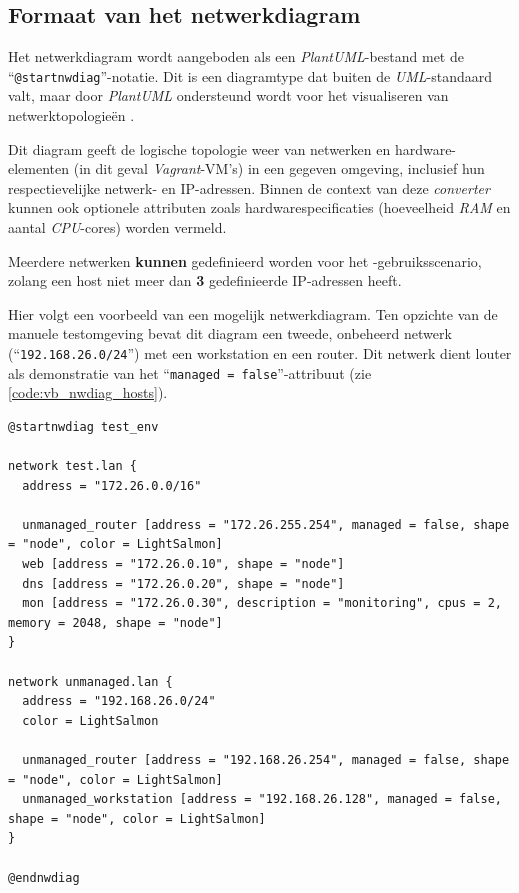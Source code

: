 \subsection{Formaat van het netwerkdiagram}%
\label{subsec:formaat_nwdiag}

Het netwerkdiagram wordt aangeboden als een \emph{PlantUML}-bestand met de ``\texttt{@startnwdiag}''-notatie. Dit is een diagramtype dat buiten de \emph{UML}-standaard valt, maar door \emph{PlantUML} ondersteund wordt voor het visualiseren van netwerktopologieën \autocite{PlantUML2025}.

Dit diagram geeft de logische topologie weer van netwerken en hardware-elementen (in dit geval \emph{Vagrant}-VM's) in een gegeven omgeving, inclusief hun respectievelijke netwerk- en IP-adressen. Binnen de context van deze \emph{converter} kunnen ook optionele attributen zoals hardwarespecificaties (hoeveelheid \emph{RAM} en aantal \emph{CPU}-cores) worden vermeld.

Meerdere netwerken \textbf{kunnen} gedefinieerd worden voor het -gebruiksscenario, zolang een host niet meer dan \textbf{3} gedefinieerde IP-adressen heeft.

Hier volgt een voorbeeld van een mogelijk netwerkdiagram. Ten opzichte van de manuele testomgeving bevat dit diagram een tweede, onbeheerd netwerk (``\texttt{192.168.26.0/24}'') met een workstation en een router. Dit netwerk dient louter als demonstratie van het ``\texttt{managed = false}''-attribuut (zie \autoref{code:vb_nwdiag_hosts}).

\begin{codeblockfixed}
\begin{codeblock}
  \begin{lstlisting}[language=plantuml]
@startnwdiag test_env

network test.lan {
  address = "172.26.0.0/16"

  unmanaged_router [address = "172.26.255.254", managed = false, shape = "node", color = LightSalmon]
  web [address = "172.26.0.10", shape = "node"]
  dns [address = "172.26.0.20", shape = "node"]
  mon [address = "172.26.0.30", description = "monitoring", cpus = 2, memory = 2048, shape = "node"]
}

network unmanaged.lan {
  address = "192.168.26.0/24"
  color = LightSalmon

  unmanaged_router [address = "192.168.26.254", managed = false, shape = "node", color = LightSalmon]
  unmanaged_workstation [address = "192.168.26.128", managed = false, shape = "node", color = LightSalmon]
}

@endnwdiag
\end{lstlisting}
  \caption[Tekstformaat voorbeeld netwerkdiagram (\emph{PlantUML})]{Tekstformaat van het voorbeeld van een netwerkdiagram in \emph{PlantUML}.}
  \label{code:nwdiag_test_env_unmanaged}
\end{codeblock}
\end{codeblockfixed}

